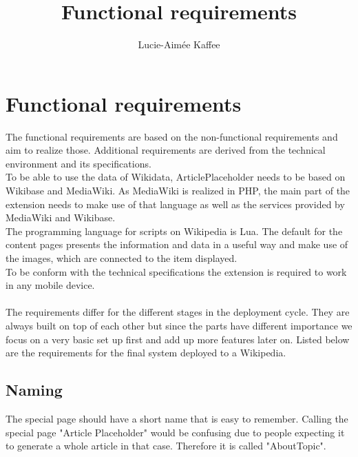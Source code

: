 \documentclass[11pt]{article}
\title {{Functional requirements}}
\author {Lucie-Aim\'{e}e Kaffee}
\date{}
\begin{document}
\listoftodos

\section {Functional requirements}
The functional requirements are based on the non-functional requirements and aim to realize those. Additional requirements are derived from the technical environment and its specifications. \\
To be able to use the data of Wikidata, ArticlePlaceholder needs to be based on Wikibase and MediaWiki.
As MediaWiki is realized in PHP, the main part of the extension needs to make use of that language as well as the services provided by MediaWiki and Wikibase. \\
The programming language for scripts on Wikipedia is Lua. %
The default for the content pages presents the information and data in a useful way and make use of the images, which are connected to the item displayed.\\
To be conform with the technical specifications the extension is required to work in any mobile device. \\
\\
The requirements differ for the different stages in the deployment cycle. They are always built on top of each other but since the parts have different importance we focus on a very basic set up first and add up more features later on. Listed below are the requirements for the final system deployed to a Wikipedia.  \\

\subsection{Naming}
The special page should have a short name that is easy to remember. Calling the special page "Article Placeholder" would be confusing due to people expecting it to generate a whole article in that case. Therefore it is called "AboutTopic". %
\end{document}
